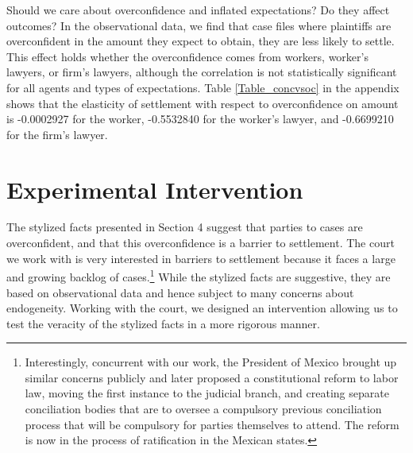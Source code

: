\documentclass[11pt]{article}
\begin{document}
Should we care about overconfidence and inflated expectations? Do they affect outcomes?
In the observational data, we find that case files where plaintiffs are overconfident in the amount they expect to obtain, they are less likely to settle. This effect holds whether the overconfidence comes from workers, worker’s lawyers, or firm’s lawyers, although the correlation is not statistically significant for all agents and types of expectations. Table \ref{Table_concvsoc} in the appendix shows that the elasticity of settlement with respect to overconfidence on amount is -0.0002927 for the worker, -0.5532840 for the worker’s lawyer, and -0.6699210 for the firm’s lawyer.





\section{Experimental Intervention}  \label{ExperimentSection}

The stylized facts presented in Section 4 suggest that parties to cases are overconfident, and that this overconfidence is a barrier to settlement. The court we work with is very interested in barriers to settlement because it faces a large and growing backlog of cases.\footnote{Interestingly, concurrent with our work, the President of Mexico brought up similar concerns publicly and later proposed a constitutional reform to labor law, moving the first instance to the judicial branch, and creating separate conciliation bodies that are to oversee a compulsory previous conciliation process that will be compulsory for parties themselves to attend. The reform is now in the process of ratification in the Mexican states.}  While the stylized facts are suggestive, they are based on observational data and hence subject to many concerns about endogeneity. Working with the court, we designed an intervention allowing us to test the veracity of the stylized facts in a more rigorous manner. 
\end{document}
